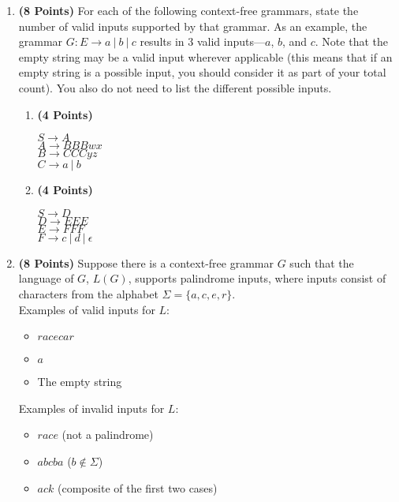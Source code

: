 \documentclass{article}[12pt]
\begin{document}
\begin{enumerate}
    \item \textbf{(8 Points)} For each of the following context-free grammars, state the number of valid inputs supported by that grammar. As an example, the grammar $G: E \rightarrow a~|~b~|~c$ results in 3 valid inputs---$a$, $b$, and $c$. Note that the empty string may be a valid input wherever applicable (this means that if an empty string is a possible input, you should consider it as part of your total count). You also do not need to list the different possible inputs.
    \begin{enumerate}
        \item \textbf{(4 Points)}
            \begin{center}
                $S \rightarrow A$\\
                $A \rightarrow BBBwx$\\
                $B \rightarrow CCCyz$\\
                $C \rightarrow a~|~b$\\
            \end{center}
        \item \textbf{(4 Points)}
            \begin{center}
                $S \rightarrow D$\\
                $D \rightarrow EEE$\\
                $E \rightarrow FFF$\\
                $F \rightarrow c~|~d~|~\epsilon$\\
            \end{center}
    \end{enumerate}

    \pagebreak
    \item \textbf{(8 Points)} Suppose there is a context-free grammar $G$ such that the language of $G$, $L(G)$, supports palindrome inputs, where inputs consist of characters from the alphabet $\Sigma = \{a, c, e, r\}$.\\
    
    Examples of valid inputs for $L$:
    \begin{itemize}
        \item $racecar$
        \item $a$
        \item The empty string
    \end{itemize}

    Examples of invalid inputs for $L$:
    \begin{itemize}
        \item $race$ (not a palindrome)
        \item $abcba$ ($b \notin \Sigma$)
        \item $ack$ (composite of the first two cases)
    \end{itemize}


\end{enumerate}
\end{document}
